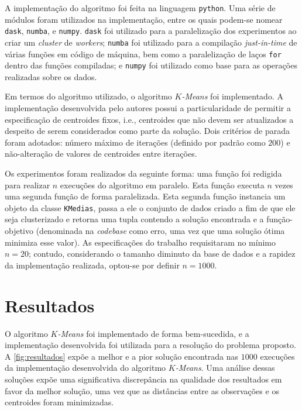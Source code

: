 \documentclass[12pt]{article}
\begin{document}
A implementação do algoritmo foi feita na linguagem \texttt{python}. Uma série de módulos foram utilizados na implementação, entre os quais podem-se nomear \texttt{dask}, \texttt{numba}, e \texttt{numpy}. \texttt{dask} foi utilizado para a paralelização dos experimentos ao criar um \textit{cluster} de \textit{workers}; \texttt{numba} foi utilizado para a compilação \textit{just-in-time} de várias funções em código de máquina, bem como a paralelização de laços \texttt{for} dentro das funções compiladas; e \texttt{numpy} foi utilizado como base para as operações realizadas sobre os dados.

Em termos do algoritmo utilizado, o algoritmo \textit{$K$-Means} foi implementado. A implementação desenvolvida pelo autores possui a particularidade de permitir a especificação de centroides fixos, i.e., centroides que não devem ser atualizados a despeito de serem considerados como parte da solução. Dois critérios de parada foram adotados: número máximo de iterações (definido por padrão como $200$) e não-alteração de valores de centroides entre iterações.

Os experimentos foram realizados da seguinte forma: uma função foi redigida para realizar $n$ execuções do algoritmo em paralelo. Esta função executa $n$ vezes uma segunda função de forma paralelizada. Esta segunda função instancia um objeto da classe \texttt{KMedias}, passa a ele o conjunto de dados criado a fim de que ele seja clusterizado e retorna uma tupla contendo a solução encontrada e a função-objetivo (denominada na \textit{codebase} como erro, uma vez que uma solução ótima minimiza esse valor). As especificações do trabalho requisitaram no mínimo $n = 20$; contudo, considerando o tamanho diminuto da base de dados e a rapidez da implementação realizada, optou-se por definir $n = 1000$.


\section{Resultados}   %
\label{sec:resultados} %



O algoritmo \textit{$K$-Means} foi implementado de forma bem-sucedida, e a implementação desenvolvida foi utilizada para a resolução do problema proposto. A \autoref{fig:resultados} expõe a melhor e a pior solução encontrada nas $1000$ execuções da implementação desenvolvida do algoritmo \textit{$K$-Means}. Uma análise dessas soluções expõe uma significativa discrepância na qualidade dos resultados em favor da melhor solução, uma vez que as distâncias entre as observações e os centroides foram minimizadas.
\end{document}
